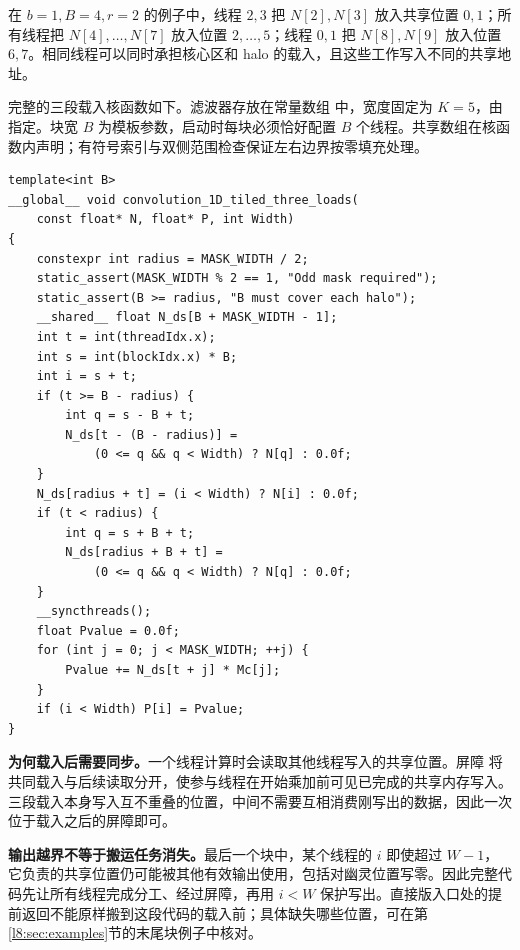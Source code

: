 在 $b=1,B=4,r=2$ 的例子中，线程 $2,3$ 把 $N[2],N[3]$ 放入共享位置 $0,1$；所有线程把 $N[4],\ldots,N[7]$ 放入位置 $2,\ldots,5$；线程 $0,1$ 把 $N[8],N[9]$ 放入位置 $6,7$。相同线程可以同时承担核心区和 halo 的载入，且这些工作写入不同的共享地址。

完整的三段载入核函数如下。滤波器存放在常量数组 \mbox{} 中，宽度固定为 $K=5$，由 \mbox{} 指定。块宽 $B$ 为模板参数，启动时每块必须恰好配置 $B$ 个线程。共享数组在核函数内声明；有符号索引与双侧范围检查保证左右边界按零填充处理。

\par\noindent\begin{minipage}{\linewidth}
\begin{lstlisting}[caption={策略 1：核心区与两侧 halo 分段载入。},label={l8:lst:three}]
template<int B>
__global__ void convolution_1D_tiled_three_loads(
    const float* N, float* P, int Width)
{
    constexpr int radius = MASK_WIDTH / 2;
    static_assert(MASK_WIDTH % 2 == 1, "Odd mask required");
    static_assert(B >= radius, "B must cover each halo");
    __shared__ float N_ds[B + MASK_WIDTH - 1];
    int t = int(threadIdx.x);
    int s = int(blockIdx.x) * B;
    int i = s + t;
    if (t >= B - radius) {
        int q = s - B + t;
        N_ds[t - (B - radius)] =
            (0 <= q && q < Width) ? N[q] : 0.0f;
    }
    N_ds[radius + t] = (i < Width) ? N[i] : 0.0f;
    if (t < radius) {
        int q = s + B + t;
        N_ds[radius + B + t] =
            (0 <= q && q < Width) ? N[q] : 0.0f;
    }
    __syncthreads();
    float Pvalue = 0.0f;
    for (int j = 0; j < MASK_WIDTH; ++j) {
        Pvalue += N_ds[t + j] * Mc[j];
    }
    if (i < Width) P[i] = Pvalue;
}
\end{lstlisting}
\end{minipage}\par

\textbf{为何载入后需要同步。}一个线程计算时会读取其他线程写入的共享位置。屏障 \mbox{} 将共同载入与后续读取分开，使参与线程在开始乘加前可见已完成的共享内存写入。三段载入本身写入互不重叠的位置，中间不需要互相消费刚写出的数据，因此一次位于载入之后的屏障即可。

\textbf{输出越界不等于搬运任务消失。}最后一个块中，某个线程的 $i$ 即使超过 $W-1$，它负责的共享位置仍可能被其他有效输出使用，包括对幽灵位置写零。因此完整代码先让所有线程完成分工、经过屏障，再用 $i<W$ 保护写出。直接版入口处的提前返回不能原样搬到这段代码的载入前；具体缺失哪些位置，可在第\ref{l8:sec:examples}节的末尾块例子中核对。

